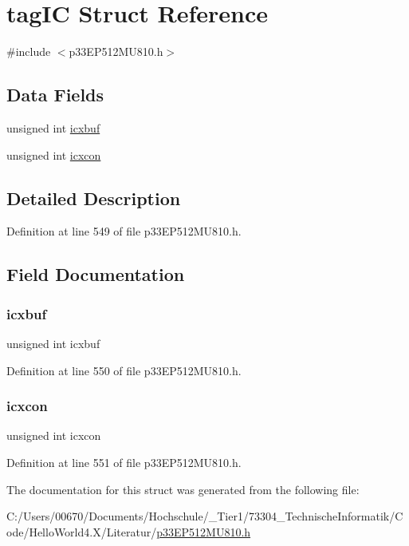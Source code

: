 \hypertarget{structtag_i_c}{}\section{tag\+IC Struct Reference}
\label{structtag_i_c}


{\ttfamily \#include $<$p33\+E\+P512\+M\+U810.\+h$>$}

\subsection*{Data Fields}
\begin{DoxyCompactItemize}
\item 
unsigned int \hyperlink{structtag_i_c_ae557d410aa679e2ba67204aeb7566392}{icxbuf}
\item 
unsigned int \hyperlink{structtag_i_c_a5fdcc8582f85c71d97c3f0231cbad23f}{icxcon}
\end{DoxyCompactItemize}


\subsection{Detailed Description}


Definition at line 549 of file p33\+E\+P512\+M\+U810.\+h.



\subsection{Field Documentation}
\mbox{\label{structtag_i_c_ae557d410aa679e2ba67204aeb7566392}} 
\subsubsection{\texorpdfstring{icxbuf}{icxbuf}}
{\footnotesize\ttfamily unsigned int icxbuf}



Definition at line 550 of file p33\+E\+P512\+M\+U810.\+h.

\mbox{\label{structtag_i_c_a5fdcc8582f85c71d97c3f0231cbad23f}} 
\subsubsection{\texorpdfstring{icxcon}{icxcon}}
{\footnotesize\ttfamily unsigned int icxcon}



Definition at line 551 of file p33\+E\+P512\+M\+U810.\+h.



The documentation for this struct was generated from the following file\+:\begin{DoxyCompactItemize}
\item 
C\+:/\+Users/00670/\+Documents/\+Hochschule/\+\_\+\+Tier1/73304\+\_\+\+Technische\+Informatik/\+Code/\+Hello\+World4.\+X/\+Literatur/\hyperlink{p33_e_p512_m_u810_8h}{p33\+E\+P512\+M\+U810.\+h}\end{DoxyCompactItemize}
